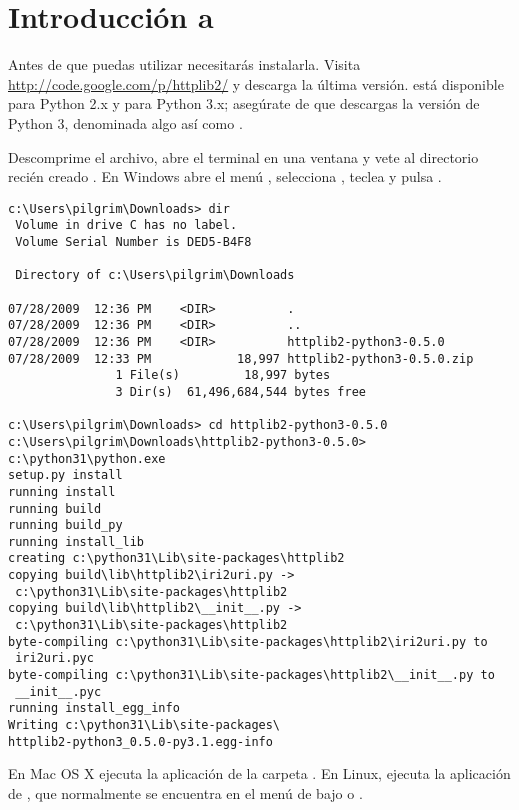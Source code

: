 \section{Introducción a }
\label{sec:httplib2}

Antes de que puedas utilizar  necesitarás instalarla. Visita \href{http://code.google.com/p/httplib2/}{http://code.\allowbreak google.com/p/httplib2/} y descarga la última versión.  está disponible para Python 2.x y para Python 3.x; asegúrate de que descargas la versión de Python 3, denominada algo así como .

Descomprime el archivo, abre el terminal en una ventana y vete al directorio recién creado . En Windows abre el menú , selecciona , teclea  y pulsa .

\noindent\begin{minipage}{\textwidth}
\begin{lstlisting}[mathescape=False]
c:\Users\pilgrim\Downloads> dir
 Volume in drive C has no label.
 Volume Serial Number is DED5-B4F8

 Directory of c:\Users\pilgrim\Downloads

07/28/2009  12:36 PM    <DIR>          .
07/28/2009  12:36 PM    <DIR>          ..
07/28/2009  12:36 PM    <DIR>          httplib2-python3-0.5.0
07/28/2009  12:33 PM            18,997 httplib2-python3-0.5.0.zip
               1 File(s)         18,997 bytes
               3 Dir(s)  61,496,684,544 bytes free

c:\Users\pilgrim\Downloads> cd httplib2-python3-0.5.0
c:\Users\pilgrim\Downloads\httplib2-python3-0.5.0> c:\python31\python.exe 
setup.py install
running install
running build
running build_py
running install_lib
creating c:\python31\Lib\site-packages\httplib2
copying build\lib\httplib2\iri2uri.py -> 
 c:\python31\Lib\site-packages\httplib2
copying build\lib\httplib2\__init__.py -> 
 c:\python31\Lib\site-packages\httplib2
byte-compiling c:\python31\Lib\site-packages\httplib2\iri2uri.py to
 iri2uri.pyc
byte-compiling c:\python31\Lib\site-packages\httplib2\__init__.py to
 __init__.pyc
running install_egg_info
Writing c:\python31\Lib\site-packages\
httplib2-python3_0.5.0-py3.1.egg-info
\end{lstlisting}
\end{minipage}

En Mac OS X ejecuta la aplicación  de la carpeta . En Linux, ejecuta la aplicación de , que normalmente se encuentra en el menú de  bajo  o .

